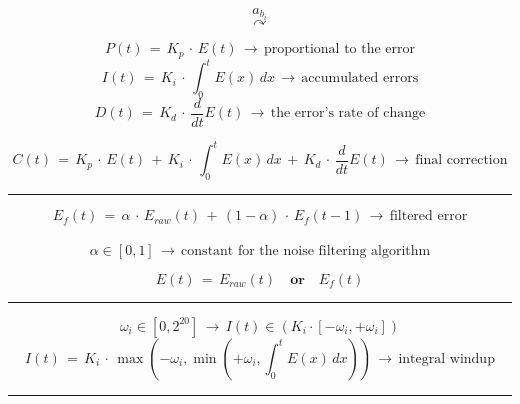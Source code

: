 \documentclass{article}
\begin{document}
    \[a_{b_{i}}\] %
    \[\curvearrowright\]

    \newpage %

    \[P(t)\, =\, K_{p}\, \cdot\, E(t)\, \longrightarrow\, \text{proportional to the error}\]
    \[I(t)\, =\, K_{i}\, \cdot\, \int_{0}^{t} E(x)\, dx\, \longrightarrow\, \text{accumulated errors}\]
    \[D(t)\, =\, K_{d}\, \cdot\, \frac{d}{dt} E(t)\, \longrightarrow\, \text{the error's rate of change}\] 

    \[C(t)\, =\, K_{p}\, \cdot\, E(t)\, +\, K_{i}\, \cdot\, \int_{0}^{t} E(x)\, dx\, +\, K_{d}\, \cdot\, \frac{d}{dt} E(t)\, \longrightarrow\, \text{final correction}\]

    \bigbreak %
    \hrule %
    \bigbreak %

    \[E_{f}(t)\, =\, \alpha\, \cdot\, E_{raw}(t)\, +\, (1 - \alpha)\, \cdot\, E_{f}(t - 1)\, \longrightarrow\, \text{filtered error}\] \
    \[\alpha \in [0, 1]\, \longrightarrow\, \text{constant for the noise filtering algorithm}\]

    \[E(t)\, =\, E_{raw}(t) \quad \textbf{or} \quad E_{f}(t)\]
    
    \bigbreak %
    \hrule %
    \bigbreak %
    
    \[\omega_{i} \in [0, 2^{20}]\, \longrightarrow\, I(t) \in (K_{i} \cdot [-\omega_{i}, +\omega_{i}])\]
    \[I(t)\, =\, K_{i}\, \cdot\, \max(-\omega_{i}, \min(+\omega_{i}, \int_{0}^{t} E(x)\, dx))\, \longrightarrow\, \text{integral windup}\]

    \bigbreak %
    \hrule %
    \bigbreak %
\end{document}
